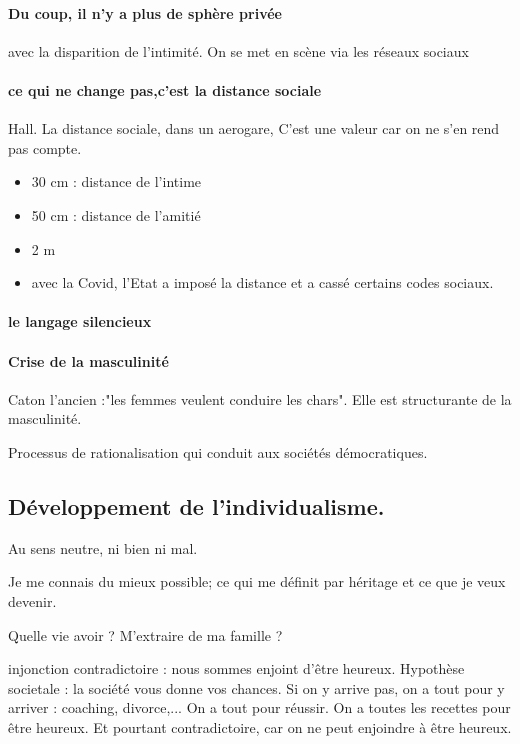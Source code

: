 \paragraph{Du coup, il n'y a plus de sphère privée} avec la disparition de l'intimité. On se met en scène via les réseaux sociaux

\paragraph{ce qui ne change pas,c'est la distance sociale} Hall. La distance sociale, 
dans un aerogare, 
C'est une valeur car on ne s'en rend pas compte. 
\begin{itemize}
    \item 30 cm : distance de l'intime
    \item 50 cm : distance de l'amitié
    \item 2 m
     \item avec la Covid, l'Etat a imposé la distance et a cassé certains codes sociaux.
\end{itemize}

\paragraph{le langage silencieux}

\paragraph{Crise de la masculinité} Caton l'ancien :"les femmes veulent conduire les chars". Elle est structurante de la masculinité.

Processus de rationalisation qui conduit aux sociétés démocratiques.
\subsection{Développement de l’individualisme.}

Au sens neutre, ni bien ni mal.

\begin{Def}[individualisme]
Je me connais du mieux possible; ce qui me définit par héritage et ce que je veux devenir.

\end{Def}
Quelle vie avoir ? M'extraire de ma famille ? 

\begin{Synthesis}
injonction contradictoire : 
nous sommes enjoint d'être heureux.
Hypothèse societale : la société vous donne vos chances.
Si on y arrive pas, on a tout pour y arriver : coaching, divorce,... On a tout pour réussir. On a toutes les recettes pour être heureux.
Et pourtant contradictoire, car on ne peut enjoindre à être heureux.
\end{Synthesis}

